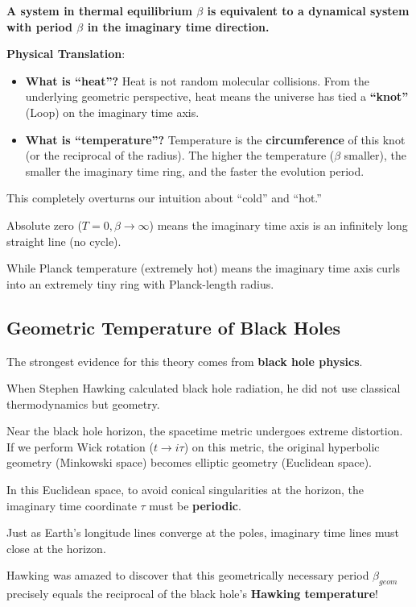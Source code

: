 \documentclass[11pt,a4paper,twoside]{book}
\begin{document}
\textbf{A system in thermal equilibrium $\beta$ is equivalent to a dynamical system with period $\beta$ in the imaginary time direction.}

\textbf{Physical Translation}:

\begin{itemize}
\item \textbf{What is ``heat''?} Heat is not random molecular collisions. From the underlying geometric perspective, heat means the universe has tied a \textbf{``knot''} (Loop) on the imaginary time axis.

\item \textbf{What is ``temperature''?} Temperature is the \textbf{circumference} of this knot (or the reciprocal of the radius). The higher the temperature ($\beta$ smaller), the smaller the imaginary time ring, and the faster the evolution period.
\end{itemize}

This completely overturns our intuition about ``cold'' and ``hot.''

Absolute zero ($T=0, \beta \to \infty$) means the imaginary time axis is an infinitely long straight line (no cycle).

While Planck temperature (extremely hot) means the imaginary time axis curls into an extremely tiny ring with Planck-length radius.

\subsection{Geometric Temperature of Black Holes}

The strongest evidence for this theory comes from \textbf{black hole physics}.

When Stephen Hawking calculated black hole radiation, he did not use classical thermodynamics but geometry.

Near the black hole horizon, the spacetime metric undergoes extreme distortion. If we perform Wick rotation ($t \to i\tau$) on this metric, the original hyperbolic geometry (Minkowski space) becomes elliptic geometry (Euclidean space).

In this Euclidean space, to avoid conical singularities at the horizon, the imaginary time coordinate $\tau$ must be \textbf{periodic}.

Just as Earth's longitude lines converge at the poles, imaginary time lines must close at the horizon.

Hawking was amazed to discover that this geometrically necessary period $\beta_{geom}$ precisely equals the reciprocal of the black hole's \textbf{Hawking temperature}!
\end{document}
